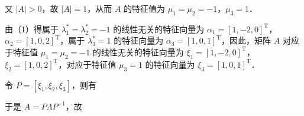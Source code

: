 %


又 $|A|>0$，故 $|A|=1$，从而 $A$ 的特征值为 $\mu_1=\mu_2=-1$，$\mu_3=1$．

由（1）得属于 $\lambda_1^{*}=\lambda_2^{*}=-1$ 的线性无关的特征向量为 $\alpha_1=[1,-2,0]^{\mathrm T}$，$\alpha_2=[1,0,2]^{\mathrm T}$，属于 $\lambda_3^{*}=1$ 的特征向量为 $\alpha_3=[1,0,1]^{\mathrm T}$，因此，矩阵 $A$ 对应于特征值 $\mu_1=\mu_2=-1$ 的线性无关的特征向量为 $\xi_1=[1,-2,0]^{\mathrm T}$，$\xi_2=[1,0,2]^{\mathrm T}$，对应于特征值 $\mu_3=1$ 的特征向量为 $\xi_3=[1,0,1]^{\mathrm T}$．

令 $P=[\xi_1,\xi_2,\xi_3]$，则有


于是 $A=P\Lambda P^{-1}$，故


